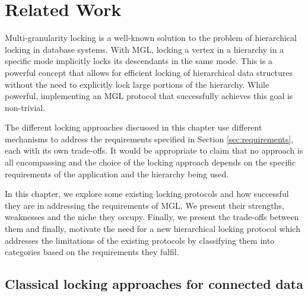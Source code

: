 \chapter{Related Work} \label{chap:relatedwork}

\minitoc

Multi-granularity locking is a well-known solution to the problem of hierarchical locking in database systems. 
With MGL, locking a vertex in a hierarchy in a specific mode implicitly locks its descendants in the same mode. 
This is a powerful concept that allows for efficient locking of hierarchical data structures without the need to explicitly lock large portions of the hierarchy.
While powerful, implementing an MGL protocol that successfully achieves this goal is non-trivial. 



The different locking approaches discussed in this chapter use different mechanisms to address the requirements specified in Section \ref{sec:requirements}, each with its own trade-offs. 
It would be appropriate to claim that no approach is all encompassing and the choice of the locking approach depends on the specific requirements of the application and the hierarchy being used. 

In this chapter, we explore some existing locking protocols and how successful they are in addressing the requirements of MGL. We present their strengths, weaknesses and the niche they occupy. Finally, we present the trade-offs between them and finally, motivate the need for a new hierarchical locking protocol which addresses the limitations of the existing protocols by classifying them into categories based on the requirements they fulfil.


\section{Classical locking approaches for connected data}

